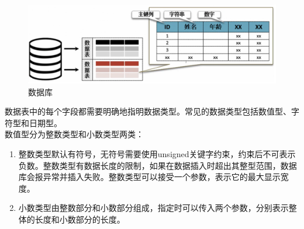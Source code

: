 \documentclass[12pt, openany, oneside]{book}
\begin{document}
\begin{figure}[H]
	\centering
	\includegraphics[]{img/C1/1.png}
	\caption{数据库}
\end{figure}

数据表中的每个字段都需要明确地指明数据类型。常见的数据类型包括数值型、字符型和日期型。\\

数值型分为整数类型和小数类型两类：

\begin{enumerate}
	\item 整数类型默认有符号，无符号需要使用unsigned关键字约束，约束后不可表示负数。整数类型有数据长度的限制，如果在数据插入时超出其整型范围，数据库会报异常并插入失败。整数类型可以接受一个参数，表示它的最大显示宽度。

	\item 小数类型由整数部分和小数部分组成，指定时可以传入两个参数，分别表示整体的长度和小数部分的长度。
\end{enumerate}

\begin{table}[H]
	\centering
	\caption{数值型}
\end{table}
\end{document}
